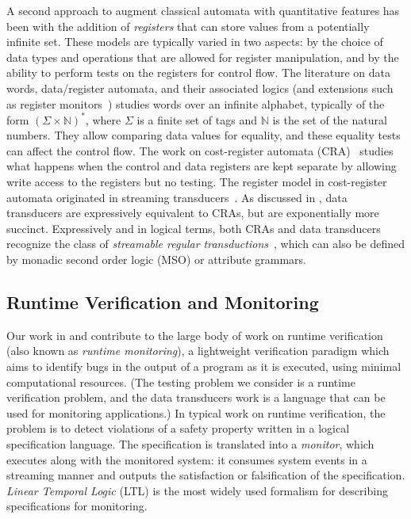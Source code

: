 A second approach to augment classical automata with quantitative features has been with the addition of \emph{registers} that can store values from a potentially infinite set. These models are typically varied in two aspects: by the choice of data types and operations that are allowed for register manipulation, and by the ability to perform tests on the registers for control flow.
The literature on data words, data/register automata, and their associated logics \cite{KF1994FMA, NSV2004FSM, DL2009LFQ, BS2010NRDL, BDMSS2011LDW} (and extensions such as register monitors~\cite{FHS2018}) studies words over an infinite alphabet, typically of the form $(\Sigma \times \mathbb{N})^*$,
where $\Sigma$ is a finite set of tags and $\mathbb{N}$ is the set of the natural numbers.
They allow comparing data values for equality, and these equality tests can affect the control flow.
The work on cost-register automata (CRA)~\cite{AdADRY2013CRA} studies what happens when the control and data registers are kept separate by allowing write access to the registers but no testing.
The register model in cost-register automata originated in streaming transducers~\cite{AC2010SST,AC2011STA,AdA2012STT}.
As discussed in ,
data transducers are expressively equivalent to CRAs, but are exponentially more succinct.
Expressively and in logical terms, both CRAs and data transducers recognize the class of \emph{streamable regular transductions}~, which can also be defined by monadic second order logic (MSO) or attribute grammars.

\subsection{Runtime Verification and Monitoring}

Our work in  and  contribute to the large body of work on runtime verification~\cite{leucker2009brief,havelund2004efficient} (also known as \emph{runtime monitoring}), a
lightweight verification paradigm which aims to identify bugs in the
output of a program as it is executed, using minimal computational
resources.
(The testing problem we consider is a runtime verification problem, and
the data transducers work is a language that can be used for monitoring applications.)
In typical work on runtime verification, the problem is to detect
violations of a safety property written in a logical specification language.
The specification is translated into a \emph{monitor}, which executes along with the monitored system: it consumes system events in a streaming manner and outputs the satisfaction or falsification of the specification. \emph{Linear Temporal Logic} (LTL) is the most widely used formalism for describing specifications for monitoring.

